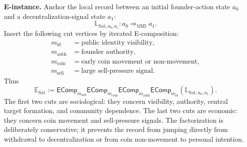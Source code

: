 \documentclass[11pt]{article}
\newcommand{\USD}{\mathsf{USD}}
\newcommand{\defeq}{\mathrel{:=}}
\newcommand{\EComp}{\mathsf{EComp}}
\theoremstyle{definition}
\theoremstyle{plain}
\begin{document}
\textbf{E-instance.}  Anchor the local record between an initial founder-action
state $a_0$ and a decentralization-signal state $a_1$:
\[
  \mathbb L_{\mathrm{Sat},a_0,a_1}:a_0\Rightarrow_{\USD}a_1.
\]
Insert the following cut vertices by iterated E-composition:
\[
\begin{aligned}
  m_{\mathrm{id}} &= \text{public identity visibility},\\
  m_{\mathrm{auth}} &= \text{founder authority},\\
  m_{\mathrm{coin}} &= \text{early coin movement or non-movement},\\
  m_{\mathrm{sell}} &= \text{large sell-pressure signal}.
\end{aligned}
\]
Thus
\[
  \mathbb E_{\mathrm{Sat}}
  \defeq
  \EComp_{m_{\mathrm{sell}}}
  \EComp_{m_{\mathrm{coin}}}
  \EComp_{m_{\mathrm{auth}}}
  \EComp_{m_{\mathrm{id}}}
  (\mathbb L_{\mathrm{Sat},a_0,a_1}).
\]
The first two cuts are sociological: they concern visibility, authority,
central target formation, and community dependence.  The last two cuts are
economic: they concern coin movement and sell-pressure signals.  The
factorization is deliberately conservative; it prevents the record from
jumping directly from withdrawal to decentralization or from coin
non-movement to personal intention.
\end{document}
